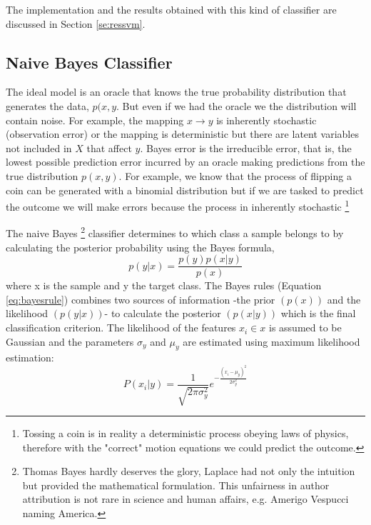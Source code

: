 \documentclass[11pt]{article}
\theoremstyle{definition}
\theoremstyle{remark}
\begin{document}
The implementation and the results obtained with this kind of classifier are discussed in Section \ref{se:ressvm}.

\subsection{Naive Bayes Classifier}
\label{sse:naivebayes}
The ideal model is an oracle that knows the true probability distribution that generates the data, $p(x,y$. But even if we had the oracle we  the distribution will contain noise. For example, the mapping $x \to y$ is inherently stochastic (observation error) or the mapping is deterministic but there are latent variables not included in $X$ that affect $y$. Bayes error is the irreducible error, that is, the lowest possible prediction error incurred by an oracle making predictions from the true distribution $p(x,y)$. For example, we know that the process of flipping a coin can be generated with a binomial distribution but if we are tasked to predict the outcome we will make errors because the process in inherently stochastic \footnote{Tossing a coin is in reality a deterministic process obeying laws of physics, therefore with the "correct" motion equations we could predict the outcome.}


The naive Bayes \footnote{Thomas Bayes hardly deserves the glory, Laplace had not only the intuition but provided the mathematical formulation. This unfairness in author attribution is not rare in science and human affairs, e.g. Amerigo Vespucci naming America.} classifier determines to which class a sample belongs to by calculating the posterior probability using the Bayes formula,
\begin{equation}
p(y|x) = \frac{p(y)p(x|y)}{p(x)}
\label{eq:bayesrule}
\end{equation}
where x is the sample and y the target class. The Bayes rules (Equation \ref{eq:bayesrule}) combines two sources of information -the prior $(p(x))$ and the likelihood $(p(y|x))$- to calculate the posterior $(p(x|y))$ which is the final classification criterion. 
The likelihood of the features $x_i \in x$ is assumed to be Gaussian and the parameters $\sigma_{y}$ and $\mu_{y}$ are estimated using maximum likelihood estimation:
\begin{equation} 
P(x_i|y)= \frac{1}{\sqrt{2\pi\sigma_y^{2}}}e^{-\frac{(x_i-\mu_y)^2}{2\sigma_y^2}}
\label{eq:naiveb}
\end{equation}
\end{document}
